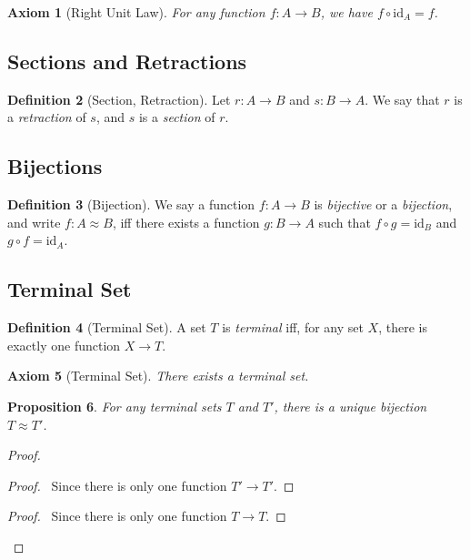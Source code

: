 \documentclass{book}
\let\qed\relax
\newtheorem{prop}{Proposition}[chapter]
\newtheorem{ax}[prop]{Axiom}
\theoremstyle{definition}
\newtheorem{df}[prop]{Definition}
\newcommand{\id}[1]{\ensuremath{\mathrm{id}_{#1}}}
\begin{document}
\begin{ax}[Right Unit Law]
For any function $f : A \rightarrow B$, we have $f \circ \id{A} = f$.
\end{ax}

\subsection{Sections and Retractions}

\begin{df}[Section, Retraction]
Let $r : A \rightarrow B$ and $s : B \rightarrow A$. We say that $r$ is a \emph{retraction} of $s$, and $s$ is a \emph{section} of $r$.
\end{df}

\subsection{Bijections}

\begin{df}[Bijection]
We say a function $f : A \rightarrow B$ is \emph{bijective} or a \emph{bijection}, and write $f : A \approx B$, iff there exists a function $g : B \rightarrow A$ such that $f \circ g = \id{B}$ and $g \circ f = \id{A}$.
\end{df}

\subsection{Terminal Set}

\begin{df}[Terminal Set]
A set $T$ is \emph{terminal} iff, for any set $X$, there is exactly one function $X \rightarrow T$.
\end{df}

\begin{ax}[Terminal Set]
There exists a terminal set.
\end{ax}

\begin{prop}
For any terminal sets $T$ and $T'$, there is a unique bijection $T \approx T'$.
\end{prop}

\begin{proof}
\pf
{}
\step{3}{$i \circ j = \id{T'}$}
\begin{proof}
	\pf\ Since there is only one function $T' \rightarrow T'$.
\end{proof}
\step{4}{$j \circ i = \id{T}$}
\begin{proof}
	\pf\ Since there is only one function $T \rightarrow T$.
\end{proof}
\qed
\end{proof}
\end{document}

